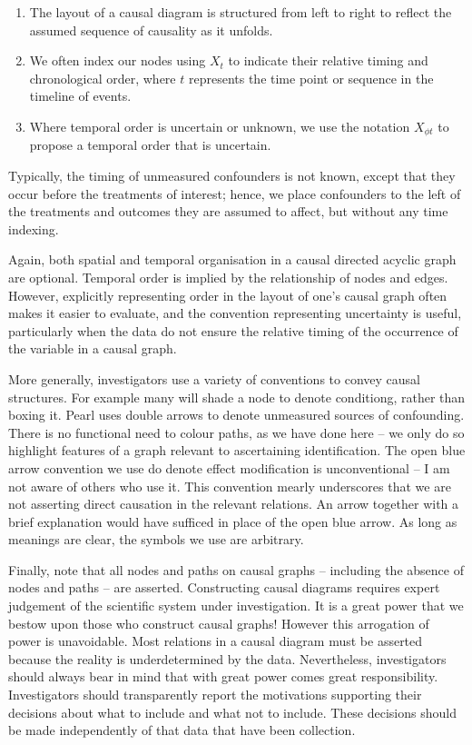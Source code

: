 \documentclass[
  single column]{article}
\providecommand{\tightlist}{%
  \setlength{\itemsep}{0pt}\setlength{\parskip}{0pt}}\usepackage{longtable,booktabs,array}
\begin{document}
\begin{enumerate}
\def\labelenumi{\arabic{enumi}.}
\tightlist
\item
  The layout of a causal diagram is structured from left to right to
  reflect the assumed sequence of causality as it unfolds.
\item
  We often index our nodes using \(X_t\) to indicate their relative
  timing and chronological order, where \(t\) represents the time point
  or sequence in the timeline of events.
\item
  Where temporal order is uncertain or unknown, we use the notation
  \(X_{\phi t}\) to propose a temporal order that is uncertain.
\end{enumerate}

Typically, the timing of unmeasured confounders is not known, except
that they occur before the treatments of interest; hence, we place
confounders to the left of the treatments and outcomes they are assumed
to affect, but without any time indexing.

Again, both spatial and temporal organisation in a causal directed
acyclic graph are optional. Temporal order is implied by the
relationship of nodes and edges. However, explicitly representing order
in the layout of one's causal graph often makes it easier to evaluate,
and the convention representing uncertainty is useful, particularly when
the data do not ensure the relative timing of the occurrence of the
variable in a causal graph.

More generally, investigators use a variety of conventions to convey
causal structures. For example many will shade a node to denote
conditiong, rather than boxing it. Pearl uses double arrows to denote
unmeasured sources of confounding. There is no functional need to colour
paths, as we have done here -- we only do so highlight features of a
graph relevant to ascertaining identification. The open blue arrow
convention we use do denote effect modification is unconventional -- I
am not aware of others who use it. This convention mearly underscores
that we are not asserting direct causation in the relevant relations. An
arrow together with a brief explanation would have sufficed in place of
the open blue arrow. As long as meanings are clear, the symbols we use
are arbitrary.

Finally, note that all nodes and paths on causal graphs -- including the
absence of nodes and paths -- are asserted. Constructing causal diagrams
requires expert judgement of the scientific system under investigation.
It is a great power that we bestow upon those who construct causal
graphs! However this arrogation of power is unavoidable. Most relations
in a causal diagram must be asserted because the reality is
underdetermined by the data. Nevertheless, investigators should always
bear in mind that with great power comes great responsibility.
Investigators should transparently report the motivations supporting
their decisions about what to include and what not to include. These
decisions should be made independently of that data that have been
collection.
\end{document}
